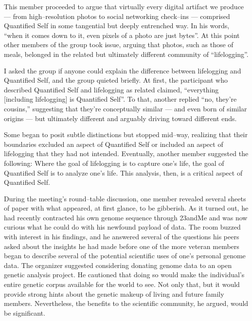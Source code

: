 \documentclass{article}
\begin{document}
This member proceeded to argue that virtually every digital artifact we produce
--- from high--resolution photos to social networking check--ins ---
comprised Quantified Self in some tangential but deeply entrenched way.
In his words,
``when it comes down to it,
even pixels of a photo are just bytes''.
At this point other members of the group took issue,
arguing that photos,
such as those of meals,
belonged in the related but ultimately different community of ``lifelogging''.

I asked the group if anyone could explain the difference between lifelogging and Quantified Self,
and the group quieted briefly.
At first,
the participant who described Quantified Self and lifelogging as related claimed,
``everything [including lifelogging] is Quantified Self''.
To that,
another replied ``no, they're cousins,'' suggesting that they're conceptually similar
--- and even born of similar origins ---
but ultimately different and arguably driving toward different ends.

Some began to posit subtle distinctions but stopped mid--way,
realizing that their boundaries excluded an aspect of Quantified Self or included an aspect of lifelogging that they had not intended.
Eventually,
another member suggested the following:
Where the goal of lifelogging is to capture one's life,
the goal of Quantified Self is to analyze one's life.
This analysis,
then,
is a critical aspect of Quantified Self.

During the meeting's round--table discussion,
one member revealed several sheets of paper with what appeared,
at first glance,
to be gibberish.
As it turned out,
he had recently contracted his own genome sequence through 23andMe and was now curious what he could do with his newfound payload of data.
The room buzzed with interest in his findings,
and he answered several of the questions his peers asked about the insights he had made before one of the more veteran members began to describe several of the potential scientific uses of one's personal genome data.
The organizer suggested considering donating genome data to an open genetic analysis project.
He cautioned that doing so would make the individual's entire genetic corpus available for the world to see.
Not only that,
but it would provide strong hints about the genetic makeup of living and future family members.
Nevertheless,
the benefits to the scientific community,
he argued,
would be significant.
\end{document}
